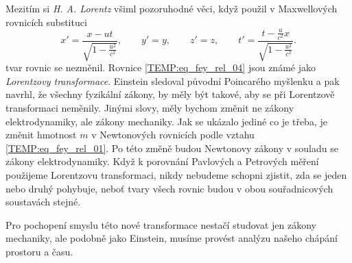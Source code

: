     Mezitím si \emph{H. A. Lorentz} všiml pozoruhodné věci, když použil v Maxwellových rovnicích substituci
    \begin{equation}\label{TEMP:eq_fey_rel_04}
      x' = \frac{x - ut}{\sqrt{1-\frac{u^2}{c^2}}}, 
           \qquad y' = y, \qquad z' = z, 
           \qquad t' = \frac{t-\frac{u}{c^2}x}{\sqrt{1-\frac{u^2}{c^2}}}. 
    \end{equation} 
    tvar rovnic se nezměnil. Rovnice \ref{TEMP:eq_fey_rel_04} jsou známé jako \emph{Lorentzovy 
    transformace}. Einstein sledoval původní Poincarého myšlenku a pak navrhl, že všechny fyzikální 
    zákony, by měly být takové, aby se při Lorentzově transformaci neměnily. Jinými slovy, měly 
    bychom změnit ne zákony elektrodynamiky, ale zákony mechaniky. Jak se ukázalo jediné co je 
    třeba, je změnit hmotnost $m$ v Newtonových rovnicích podle vztahu \ref{TEMP:eq_fey_rel_01}. Po 
    této změně budou Newtonovy zákony v souladu se zákony elektrodynamiky. Když k porovnání 
    Pavlových a Petrových měření použijeme Lorentzovu transformaci, nikdy nebudeme schopni zjistit, 
    zda se jeden nebo druhý pohybuje, neboť tvary všech rovnic budou v obou souřadnicových 
    soustavách stejné. 
    
    Pro pochopení smyslu této nové transformace nestačí studovat jen zákony mechaniky, ale podobně 
    jako Einstein, musíme provést analýzu našeho chápání prostoru a času. 

\printbibliography[heading=subbibliography]
